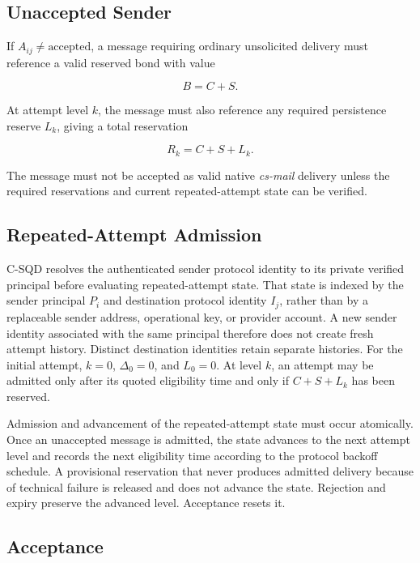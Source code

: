 \documentclass[11pt]{article}
\begin{document}
\subsection*{Unaccepted Sender}

If $A_{ij}\neq\text{accepted}$, a message requiring ordinary unsolicited delivery must reference a valid reserved bond with value

\begin{equation}
B=C+S.
\end{equation}

At attempt level $k$, the message must also reference any required persistence reserve $L_k$, giving a total reservation

\begin{equation}
R_k=C+S+L_k.
\end{equation}

The message must not be accepted as valid native \textit{cs-mail} delivery unless the required reservations and current repeated-attempt state can be verified.

\subsection*{Repeated-Attempt Admission}

C-SQD resolves the authenticated sender protocol identity to its private verified principal before evaluating repeated-attempt state. That state is indexed by the sender principal $P_i$ and destination protocol identity $I_j$, rather than by a replaceable sender address, operational key, or provider account. A new sender identity associated with the same principal therefore does not create fresh attempt history. Distinct destination identities retain separate histories. For the initial attempt, $k=0$, $\Delta_0=0$, and $L_0=0$. At level $k$, an attempt may be admitted only after its quoted eligibility time and only if $C+S+L_k$ has been reserved.

Admission and advancement of the repeated-attempt state must occur atomically. Once an unaccepted message is admitted, the state advances to the next attempt level and records the next eligibility time according to the protocol backoff schedule. A provisional reservation that never produces admitted delivery because of technical failure is released and does not advance the state. Rejection and expiry preserve the advanced level. Acceptance resets it.

\subsection*{Acceptance}
\end{document}

